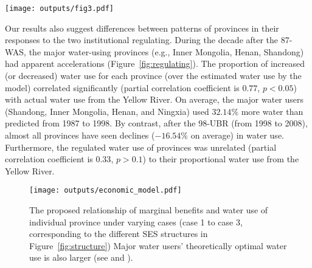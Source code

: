 \documentclass[default, sn-standardnature]{sn-jnl}
\begin{document}
\begin{figure*}[!htb]
	\centering
	\texttt{[image: outputs/fig3.pdf]}
	\caption{
		Regulating differences for provinces in the YRB.
		Red (the 87-WAS) and green (the 98-UBR) bars denote an increased or decreased ratio for actual water use relative to the estimate from the model in the decade after the institutional shift.
		The grey bars indicate the proportions of actual water use for each province relative to their total water use in the decade after the institutional shift.
		The triangles mark the water quotas assigned under the institution, converted to ratios by dividing by their sum.
	}
	\label{fig:regulating}
\end{figure*}

Our results also suggest differences between patterns of provinces in their responses to the two institutional regulating.
During the decade after the 87-WAS, the major water-using provinces (e.g., Inner Mongolia, Henan, Shandong) had apparent accelerations (Figure~\ref{fig:regulating}).
The proportion of increased (or decreased) water use for each province (over the estimated water use by the model) correlated significantly (partial correlation coefficient is $0.77$, $p<0.05$) with actual water use from the Yellow River.
On average, the major water users (Shandong, Inner Mongolia, Henan, and Ningxia) used $32.14\%$ more water than predicted from 1987 to 1998.
By contrast, after the 98-UBR (from 1998 to 2008), almost all provinces have seen declines ($-16.54\%$ on average) in water use.
Furthermore, the regulated water use of provinces was unrelated (partial correlation coefficient is $0.33$, $p>0.1$) to their proportional water use from the Yellow River.




\begin{figure}[!htb]
	\centering
	\texttt{[image: outputs/economic\_model.pdf]}
	\caption{
		The proposed relationship of marginal benefits and water use of individual province under varying cases (case 1 to case 3, corresponding to the different SES structures in Figure~\ref{fig:structure}) Major water users' theoretically optimal water use is also larger (see  and \textit{}).}
	\label{fig:model}
\end{figure}
\end{document}
